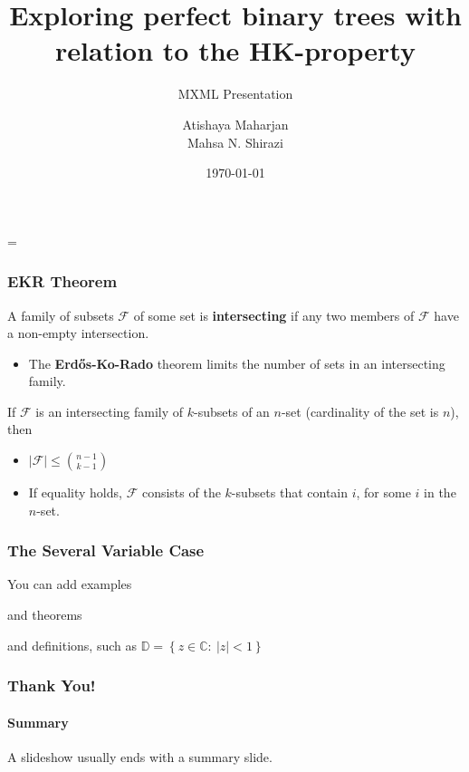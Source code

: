 \documentclass[10pt,]{beamer}
\title[HK-property | Perfect Binary Trees]{Exploring perfect binary trees with relation to the HK-property}
\subtitle{MXML Presentation} %
\author[A.M, M.N.S]{Atishaya Maharjan \\ Mahsa N. Shirazi}
\date{\today}
\begin{document}
\parskip = \baselineskip

\begin{frame} %
    \titlepage
\end{frame}

\begin{frame}\frametitle{EKR Theorem}
    \begin{definition}
        A family of subsets $\mathcal{F}$ of some set is \textbf{intersecting} if any two members of $\mathcal{F}$ have a non-empty intersection.
    \end{definition}
    \begin{itemize}
        \item The \textbf{Erd\H{o}s-Ko-Rado}  theorem limits the number of sets in an intersecting family.
    \end{itemize}
    \begin{theorem}
        If $\mathcal{F}$ is an intersecting family of $k$-subsets of an $n$-set (cardinality of the set is $n$), then
        \begin{itemize}
            \item $|\mathcal{F}| \leq \binom{n - 1}{k - 1}$
            \item If equality holds, $\mathcal{F}$ consists of the $k$-subsets that contain $i$, for some $i$ in the $n$-set.
        \end{itemize}
    \end{theorem}
\end{frame}

\begin{frame}\frametitle{The Several Variable Case}

    \begin{example}
        You can add examples
    \end{example}\pause

    \begin{theorem}
        and theorems
    \end{theorem}\pause %

    \begin{definition}
        and definitions, such as \(\mathbb{D} = \left\{z\in \mathbb{C} :\: \left|z\right|<1 \right\}\)
    \end{definition}
\end{frame}


\begin{frame}\frametitle{Thank You!}
    \framesubtitle{Summary}
    A slideshow usually ends with a summary slide.
\end{frame}

\end{document}
